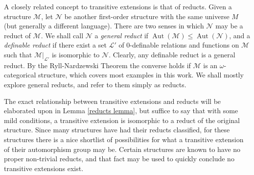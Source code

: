 \documentclass{amsart}
\newtheorem{definition}[theorem]{Definition}
\def\lang{\mathcal{L}}
\newcommand{\set}[1]{\{#1 \}}
\newcommand{\model}{\mathcal{M}}
\newcommand{\nodel}{\mathcal{N}}
\DeclareMathOperator{\Aut}{Aut}
\begin{document}




A closely related concept to transitive extensions is that of reducts. Given a structure $\model$, let $\nodel$ be another first-order structure with the same universe $M$ (but generally a different language). There are two senses in which $\nodel$ may be a reduct of $\model$. We shall call $\nodel$ a \emph{general reduct} if $\Aut(\model) \leq \Aut(\nodel)$, and a \emph{definable reduct} if there exist a set $\lang'$ of 0-definable relations and functions on $\model$ such that $\model|_{\lang'}$ is isomorphic to $\nodel$. Clearly, any definable reduct is a general reduct. By the Ryll-Nardzewski Theorem the converse holds if $\model$ is an $\omega$-categorical structure, which covers most examples in this work. We shall mostly explore general reducts, and refer to them simply as reducts. 

The exact relationship between transitive extensions and reducts will be elaborated upon in Lemma \ref{reducts lemma}, but suffice to say that with some mild conditions, a transitive extension is isomorphic to a reduct of the original structure. Since many structures have had their reducts classified, for these structures there is a nice shortlist of possibilities for what a transitive extension of their automorphism group may be. Certain structures are known to have no proper non-trivial reducts, and that fact may be used to quickly conclude no transitive extensions exist.
\end{document}
